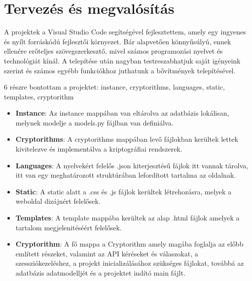 \chapter{Tervezés és megvalósítás}

A projektek a Visual Studio Code segítségével fejlesztettem, amely egy ingyenes és nyílt forráskódú fejlesztői környezet. Bár alapvetően könnyűsúlyú, ennek ellenére erőteljes szövegszerkesztő, mivel számos programozási nyelvet és technológiát kínál. A telepítése után nagyban testreszabhatjuk saját igényeink szerint és számos egyébb funkciókhoz juthatunk a bővítmények telepítésével.

6 részre bontottam a projektet: instance, cryptorithms, languages, static, templates, cryptorithm 

\begin{itemize}
	\item\textbf{Instance}:
Az instance mappában van eltárolva az adatbázis lokálisan, melynek modelje a models.py fájlban van definiálva.

	\item\textbf{Cryptorithms}:
A cryptorithms mappában levő fájlokban kerültek lettek kivitelezve és implementálva a kriptográfiai rendszerek.

	\item\textbf{Languages}:
A nyelvekért felelős .json kiterjesztésű fájlok itt vannak tárolva, itt van egy meghatározott struktúrában lefordított tartalma az oldalnak.

	\item\textbf{Static}:
A static alatt a .css és .js fájlok kerültek létrehozásra, melyek a weboldal dizájnért felelősek.

	\item\textbf{Templates}:
A template mappába kerültek az alap .html fájlok amelyek a tartalom megjelenitéséért felelősek.

	\item\textbf{Cryptorithm}:
A fő mappa a Cryptorithm amely magába foglalja az előbb említett részeket, valamint az API kéréseket és válaszokat, a szessziókezeléshez, a projekt inicializálásához szükséges fájlokat, továbbá az adatbázis adatmodelljét és a projektet indító main fájlt.

\end{itemize}

